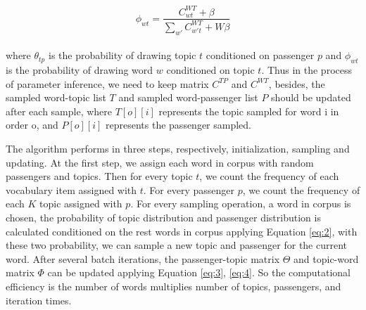 \documentclass{llncs}
\begin{document}
\begin{equation}
\label{eq:4}
\phi_{wt} = \frac{C_{wt}^{WT}+\beta}{\sum_{w'}C_{w't}^{WT}+W\beta}
\end{equation}\\
where $\theta_{tp}$ is the probability of drawing topic $t$ conditioned on passenger $p$ and $\phi_{wt}$ is the probability of drawing word $w$ conditioned on topic $t$. Thus in the process of parameter inference, we need to keep matrix $C^{TP}$ and $C^{WT}$, besides, the sampled word-topic list $T$ and sampled word-passenger list $P$ should be updated after each sample, where $T[o][i]$ represents the topic sampled for word i in order o, and $P[o][i]$ represents the passenger sampled.\par
The algorithm performs in three steps, respectively, initialization, sampling and updating. At the first step, we assign each word in corpus with random passengers and topics. Then for every topic $t$, we count the frequency of each vocabulary item assigned with $t$. For every passenger $p$, we count the frequency of each $K$ topic assigned with $p$. For every sampling operation, a word in corpus is chosen, the probability of topic distribution and passenger distribution is calculated conditioned on the rest words in corpus applying Equation \ref{eq:2}, with these two probability, we can sample a new topic and passenger for the current word. After several batch iterations, the passenger-topic matrix $\Theta$ and topic-word matrix $\Phi$ can be updated applying Equation \ref{eq:3}, \ref{eq:4}. So the computational efficiency is the number of words multiplies number of topics, passengers, and iteration times.\par
\end{document}
